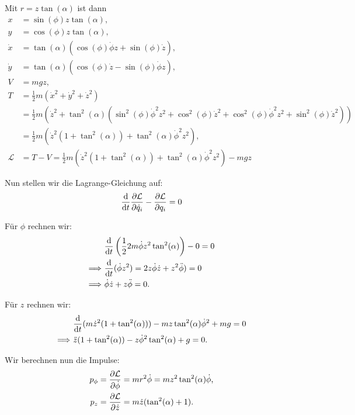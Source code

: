 Mit $r = z \tan(\alpha)$ ist dann
\begin{align*}
	x &= \sin(\phi) z \tan(\alpha) \text{,} \\
	y &= \cos(\phi) z \tan(\alpha) \text{,} \\
	\dot{x} &= \tan(\alpha) (\cos(\phi) \dot{\phi} z + \sin(\phi) \dot{z}) \text{,} \\
	\dot{y} &= \tan(\alpha) (\cos(\phi) \dot{z} - \sin(\phi) \dot{\phi} z) \text{,} \\
	V &= m g z \text{,} \\
	T &= \frac{1}{2} m (\dot{x}^2 + \dot{y}^2 + \dot{z}^2 ) \\
	  &= \frac{1}{2} m \left( \dot{z}^2 + \tan^2(\alpha) ( \sin^2(\phi) \dot{\phi}^2 z^2 + \cos^2(\phi) \dot{z}^2 + \cos^2(\phi) \dot{\phi}^2 z^2 + \sin^2(\phi) \dot{z}^2) \right) \\
	  &= \frac{1}{2} m \left( \dot{z}^2 (1 + \tan^2(\alpha)) + \tan^2(\alpha) \dot{\phi}^2 z^2 \right) \text{,} \\
	\mathcal{L} &= T - V = \frac{1}{2} m \left( \dot{z}^2 (1 + \tan^2(\alpha)) + \tan^2(\alpha) \dot{\phi}^2 z^2 \right) - m g z
\end{align*}

Nun stellen wir die Lagrange-Gleichung auf:
\[
	\frac{\mathrm{d}}{\mathrm{d}t} \frac{\partial \mathcal{L}}{\partial \dot{q}_i} - \frac{\partial \mathcal{L}}{\partial q_i} = 0
\]

Für $\phi$ rechnen wir:
\begin{align*}
	&~ \frac{\mathrm{d}}{\mathrm{d}t} \left( \frac{1}{2} 2 m \dot{\phi} z^2 \tan^2(\alpha) \right) - 0 = 0 \\
	\Longrightarrow &~ \frac{\mathrm{d}}{\mathrm{d}t} (\dot{\phi} z^2) = 2 z \dot{\phi} \dot{z} + z^2 \ddot{\phi}) = 0 \\
	\Longrightarrow &~ \dot{\phi} \dot{z} + z \ddot{\phi} = 0
	\text{.}
\end{align*}

Für $z$ rechnen wir:
\begin{align*}
	&~ \frac{\mathrm{d}}{\mathrm{d}t} (m \dot{z}^2 (1 + \tan^2(\alpha))) - m z \tan^2(\alpha) \dot{\phi}^2 + mg = 0 \\
	\Longrightarrow &~ \ddot{z} (1 + \tan^2(\alpha)) - z \dot{\phi}^2 \tan^2(\alpha) + g = 0
	\text{.}	
\end{align*}

Wir berechnen nun die Impulse:
\begin{align*}
	p_\phi &= \frac{\partial \mathcal{L}}{\partial \dot{\phi}} = m r^2 \dot{\phi} = m z^2 \tan^2(\alpha) \dot{\phi} \text{,} \\
	p_z &= \frac{\partial \mathcal{L}}{\partial \dot{z}} = m \dot{z} (\tan^2(\alpha) + 1)
	\text{.}	
\end{align*}

